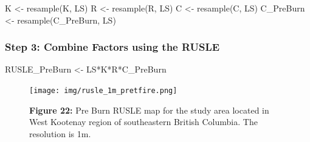 \documentclass[
]{article}
\newenvironment{Shaded}{\begin{snugshade}}{\end{snugshade}}
\newcommand{\FunctionTok}[1]{\textcolor[rgb]{0.00,0.00,0.00}{#1}}
\newcommand{\NormalTok}[1]{#1}
\newcommand{\OtherTok}[1]{\textcolor[rgb]{0.56,0.35,0.01}{#1}}
\newcommand{\SpecialCharTok}[1]{\textcolor[rgb]{0.00,0.00,0.00}{#1}}
\begin{document}
\begin{Shaded}
\begin{Highlighting}[]
\NormalTok{K }\OtherTok{\textless{}{-}}  \FunctionTok{resample}\NormalTok{(K, LS)}
\NormalTok{R }\OtherTok{\textless{}{-}}  \FunctionTok{resample}\NormalTok{(R, LS)}
\NormalTok{C }\OtherTok{\textless{}{-}}  \FunctionTok{resample}\NormalTok{(C, LS)}
\NormalTok{C\_PreBurn }\OtherTok{\textless{}{-}}  \FunctionTok{resample}\NormalTok{(C\_PreBurn, LS)}
\end{Highlighting}
\end{Shaded}

\hypertarget{sec-step-4-combine-factors-using-the-rusle}{%
\subsubsection*{Step 3: Combine Factors using the RUSLE}\label{sec-step-4-combine-factors-using-the-rusle}}

\begin{Shaded}
\begin{Highlighting}[]
\NormalTok{RUSLE\_PreBurn }\OtherTok{\textless{}{-}}\NormalTok{ LS}\SpecialCharTok{*}\NormalTok{K}\SpecialCharTok{*}\NormalTok{R}\SpecialCharTok{*}\NormalTok{C\_PreBurn}
\end{Highlighting}
\end{Shaded}

\begin{figure}
\centering
\texttt{[image: img/rusle\_1m\_pretfire.png]}
\caption{\textbf{Figure 22:} Pre Burn RUSLE map for the study area located in West Kootenay region of southeastern British Columbia. The resolution is 1m.}
\end{figure}
\end{document}
